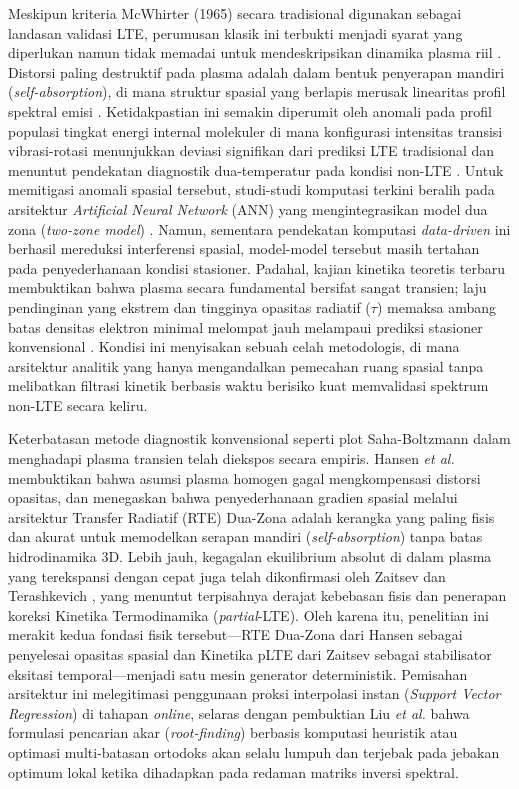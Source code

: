 \documentclass[10pt,leqno]{amsart}
\begin{document}
Meskipun kriteria McWhirter (1965) secara tradisional digunakan sebagai landasan validasi LTE, perumusan klasik ini terbukti menjadi syarat yang diperlukan namun tidak memadai untuk mendeskripsikan dinamika plasma riil \cite{bultel_mcwhirter_2025}. Distorsi paling destruktif pada plasma adalah dalam bentuk penyerapan mandiri (\textit{self-absorption}), di mana struktur spasial yang berlapis merusak linearitas profil spektral emisi \cite{tang_review_2024}. Ketidakpastian ini semakin diperumit oleh anomali pada profil populasi tingkat energi internal molekuler di mana konfigurasi intensitas transisi vibrasi-rotasi menunjukkan deviasi signifikan dari prediksi LTE tradisional dan menuntut pendekatan diagnostik dua-temperatur pada kondisi non-LTE \cite{terashkevich_two-temperature_2024}. Untuk memitigasi anomali spasial tersebut, studi-studi komputasi terkini beralih pada arsitektur \textit{Artificial Neural Network} (ANN) yang mengintegrasikan model dua zona (\textit{two-zone model}) \cite{zaitsev_two-zone_2024,amogh_libs_2026,m_s_machine_2025}. Namun, sementara pendekatan komputasi \textit{data-driven} ini berhasil mereduksi interferensi spasial, model-model tersebut masih tertahan pada penyederhanaan kondisi stasioner. Padahal, kajian kinetika teoretis terbaru membuktikan bahwa plasma secara fundamental bersifat sangat transien; laju pendinginan yang ekstrem dan tingginya opasitas radiatif ($\tau$) memaksa ambang batas densitas elektron minimal melompat jauh melampaui prediksi stasioner konvensional \cite{bultel_mcwhirter_2025}. Kondisi ini menyisakan sebuah celah metodologis, di mana arsitektur analitik yang hanya mengandalkan pemecahan ruang spasial tanpa melibatkan filtrasi kinetik berbasis waktu berisiko kuat memvalidasi spektrum non-LTE secara keliru.

Keterbatasan metode diagnostik konvensional seperti plot Saha-Boltzmann dalam menghadapi plasma transien telah diekspos secara empiris. Hansen \textit{et al.} \cite{hansen_modeling_2021} membuktikan bahwa asumsi plasma homogen gagal mengkompensasi distorsi opasitas, dan menegaskan bahwa penyederhanaan gradien spasial melalui arsitektur Transfer Radiatif (RTE) Dua-Zona adalah kerangka yang paling fisis dan akurat untuk memodelkan serapan mandiri (\textit{self-absorption}) tanpa batas hidrodinamika 3D. Lebih jauh, kegagalan ekuilibrium absolut di dalam plasma yang terekspansi dengan cepat juga telah dikonfirmasi oleh Zaitsev dan Terashkevich \cite{zaitsev_two-zone_2024}, yang menuntut terpisahnya derajat kebebasan fisis dan penerapan koreksi Kinetika Termodinamika (\textit{partial}-LTE). Oleh karena itu, penelitian ini merakit kedua fondasi fisik tersebut---RTE Dua-Zona dari Hansen sebagai penyelesai opasitas spasial dan Kinetika pLTE dari Zaitsev sebagai stabilisator eksitasi temporal---menjadi satu mesin generator deterministik. Pemisahan arsitektur ini melegitimasi penggunaan proksi interpolasi instan (\textit{Support Vector Regression}) di tahapan \textit{online}, selaras dengan pembuktian Liu \textit{et al.} \cite{lin_enhancing_2026} bahwa formulasi pencarian akar (\textit{root-finding}) berbasis komputasi heuristik atau optimasi multi-batasan ortodoks akan selalu lumpuh dan terjebak pada jebakan optimum lokal ketika dihadapkan pada redaman matriks inversi spektral.
\end{document}
